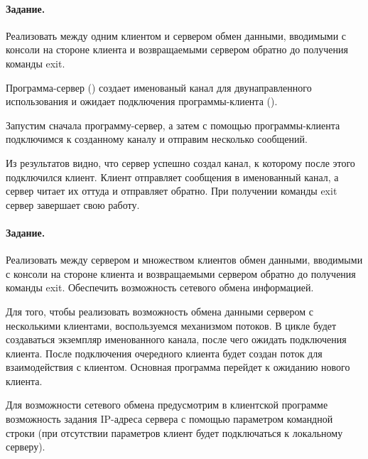 \paragraph{Задание.} Реализовать между одним клиентом и сервером обмен данными, вводимыми с консоли на стороне клиента и возвращаемыми сервером обратно до получения команды exit.

Программа-сервер () создает именованый канал для двунаправленного использования и ожидает подключения программы-клиента ().





Запустим сначала программу-сервер, а затем с помощью программы-клиента подключимся к созданному каналу и отправим несколько сообщений.





Из результатов видно, что сервер успешно создал канал, к которому после этого подключился клиент. Клиент отправляет сообщения в именованный канал, а сервер читает их оттуда и отправляет обратно. При получении команды exit сервер завершает свою работу.

\paragraph{Задание.} Реализовать между сервером и множеством клиентов обмен данными, вводимыми с консоли на стороне клиента и возвращаемыми сервером обратно до получения команды exit. Обеспечить возможность сетевого обмена информацией.

Для того, чтобы реализовать возможность обмена данными сервером с несколькими клиентами, воспользуемся механизмом потоков. В цикле будет создаваться экземпляр именованного канала, после чего ожидать подключения клиента. После подключения очередного клиента будет создан поток для взаимодействия с клиентом. Основная программа перейдет к ожиданию нового клиента.

Для возможности сетевого обмена предусмотрим в клиентской программе возможность задания IP-адреса сервера с помощью параметром командной строки (при отсутствии параметров клиент будет подключаться к локальному серверу).

